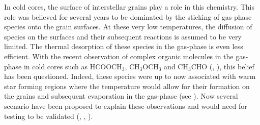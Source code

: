 In cold cores, the surface of interstellar grains play a role in this chemistry. This role was believed for several years to be dominated by the sticking of gas-phase species onto the grain surfaces. At these very low temperatures, the diffusion of species on the surfaces and their subsequent reactions is assumed to be very limited. The thermal desorption of these species in the gas-phase is even less efficient. With the recent observation of complex organic molecules in the gas-phase in cold cores such as HCOOCH$_3$, CH$_3$OCH$_3$ and CH$_3$CHO (\cite{Bacmann_2012}, \cite{2014ApJ...795L...2V}), this belief has been questioned. Indeed, these species were up to now associated with warm star forming regions where the temperature would allow for their formation on the grains and subsequent evaporation in the gas-phase (see \cite{Herbst_2009}). Now several scenario have been proposed to explain these observations and would need for testing to be validated (\cite{2013ApJ...769...34V}, \cite{2015MNRAS.449L..16B}, \cite{2015MNRAS.447.4004R}).



  
  
  
  
  
  
  
  
  
  
  
  
  
  
  